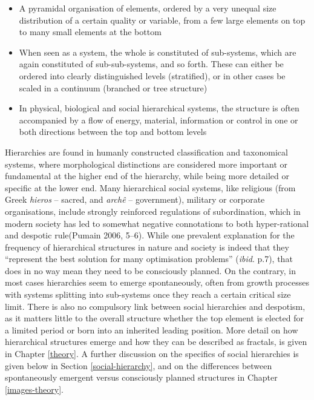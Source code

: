 \documentclass[
  12pt,
  a4paper, twoside]{book}
\begin{document}
\begin{itemize}
\item
  A pyramidal organisation of elements, ordered by a very unequal size distribution of a certain quality or variable, from a few large elements on top to many small elements at the bottom
\item
  When seen as a system, the whole is constituted of sub-systems, which are again constituted of sub-sub-systems, and so forth. These can either be ordered into clearly distinguished levels (stratified), or in other cases be scaled in a continuum (branched or tree structure)
\item
  In physical, biological and social hierarchical systems, the structure is often accompanied by a flow of energy, material, information or control in one or both directions between the top and bottom levels
\end{itemize}

Hierarchies are found in humanly constructed classification and taxonomical systems, where morphological distinctions are considered more important or fundamental at the higher end of the hierarchy, while being more detailed or specific at the lower end. Many hierarchical social systems, like religious (from Greek \emph{hieros} -- sacred, and \emph{archê} -- government), military or corporate organisations, include strongly reinforced regulations of subordination, which in modern society has led to somewhat negative connotations to both hyper-rational and despotic rule(Pumain 2006, 5--6). While one prevalent explanation for the frequency of hierarchical structures in nature and society is indeed that they ``represent the best solution for many optimisation problems'' (\emph{ibid}. p.7), that does in no way mean they need to be consciously planned. On the contrary, in most cases hierarchies seem to emerge spontaneously, often from growth processes with systems splitting into sub-systems once they reach a certain critical size limit. There is also no compulsory link between social hierarchies and despotism, as it matters little to the overall structure whether the top element is elected for a limited period or born into an inherited leading position. More detail on how hierarchical structures emerge and how they can be described as fractals, is given in Chapter \ref{theory}. A further discussion on the specifics of social hierarchies is given below in Section \ref{social-hierarchy}, and on the differences between spontaneously emergent versus consciously planned structures in Chapter \ref{images-theory}.
\end{document}
